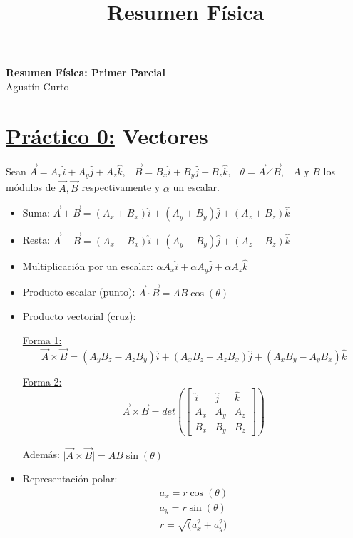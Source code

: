 \documentclass[12pt,a4paper]{article}
\title{Resumen Física}
\providecommand{\abs}[1]{\lvert#1\rvert}
\newcommand{\PN}{\par\noindent}
\begin{document}
	\begin{center}
		\Huge \textbf{Resumen Física: Primer Parcial} \\
		\large Agustín Curto
	\end{center}

	\section*{\underline{Práctico 0:} Vectores}
		\PN Sean $\vec{A} = A_{x} \hat{i} + A_{y} \hat{j} + A_{z} \hat{k}$, $\;$ $\vec{B} = B_{x} \hat{i} + B_{y} \hat{j} +
			B_{z} \hat{k}$, $\;$ $\theta = \vec{A} \angle \vec{B}$, $\;$ $A$ y $B$ los módulos de $\vec{A}, \vec{B}$
			respectivamente y $\alpha$ un escalar.
		\begin{multicols}{2}
			\begin{itemize}
				\item Suma: $\vec{A} + \vec{B} = (A_{x} + B_{x}) \hat{i} + (A_{y} + B_{y}) \hat{j} + (A_{z} + B_{z}) \hat{k}$
				\item Resta: $\vec{A} - \vec{B} = (A_{x} - B_{x}) \hat{i} + (A_{y} - B_{y}) \hat{j} + (A_{z} - B_{z}) \hat{k}$
				\item Multiplicación por un escalar: $\alpha A_{x} \hat{i} + \alpha A_{y} \hat{j} + \alpha A_{z} \hat{k}$
				\item Producto escalar (punto): $\vec{A} \cdot \vec{B} = AB \cos(\theta)$
				\item Producto vectorial (cruz):
					\PN \underline{Forma 1:}
					\[
						\vec{A} \times \vec{B} = (A_{y}B_{z} - A_{z}B_{y}) \hat{i} + (A_{x}B_{z} - A_{z}B_{x}) \hat{j} +
						(A_{x}B_{y} - A_{y}B_{x}) \hat{k}
					\]

					\PN \underline{Forma 2:}
						\[
							\vec{A} \times \vec{B} = det
								\left(
								  \begin{bmatrix}
								    \hat{i} & \hat{j} & \hat{k} \\
								    A_{x} & A_{y} & A_{z} \\
								    B_{x} & B_{y} & B_{z}
								  \end{bmatrix}
								\right)
						\]
					\PN Además: $\abs{\vec{A} \times \vec{B}} = AB \sin(\theta)$
				\item Representación polar:
					\begin{eqnarray*}
						a_{x} = r \cos(\theta) \\
						a_{y} = r \sin(\theta) \\
						r = \sqrt(a_{x}^{2} + a_{y}^{2})
					\end{eqnarray*}
			\end{itemize}
		\end{multicols}
\end{document}
